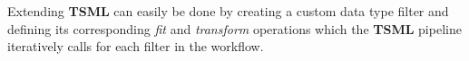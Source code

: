 \documentclass{juliacon}
\begin{document}
\vskip 6pt

Extending \textbf{TSML} can easily be done by creating a custom data type filter and defining its corresponding \emph{fit} and \emph{transform} operations which the \textbf{TSML} pipeline iteratively calls for each filter in the workflow.



\end{document}
